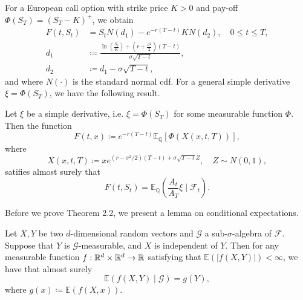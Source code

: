 For a European call option with strike price $K>0$ and pay-off $\Phi(S_{T})=(S_{T}-K)^{+}$, we obtain
\begin{align}
    F(t,S_{t})&=S_{t}N(d_{1})-e^{-r(T-t)}KN(d_{2}),\quad 0\leq t\leq T,\label{BSFormula}\\
    d_{1}&\coloneqq \frac{\ln\left(\frac{S_{t}}{K}\right)+\left(r+\frac{\sigma^{2}}{2}\right)(T-t)}{\sigma\sqrt{T-t}},\\
    d_{2}&\coloneqq d_{1}-\sigma\sqrt{T-t},
\end{align}
and where $N(\cdot)$ is the standard normal cdf. For a general simple derivative $\xi=\Phi(S_{T})$, we have the following result.
\begin{thm}
    Let $\xi$ be a simple derivative, i.e. $\xi=\Phi(S_{T})$ for some measurable function $\Phi$. Then the function
    \begin{equation}
        F(t,x)\coloneqq e^{-r(T-t)}\mathbb{E}_{\mathbb{Q}}\left[\Phi(X(x,t,T))\right],
    \end{equation}
    where 
    \begin{equation}
        X(x,t,T)\coloneqq xe^{(r-\sigma^{2}/2)(T-t)+\sigma\sqrt{T-t}Z},\quad Z\sim N(0,1),
    \end{equation}
satifies almost surely that
\begin{equation}
    F(t,S_{t})=\mathbb{E}_{\mathbb{Q}}\left(\frac{A_{t}}{A_{T}}\xi \mid \mathcal{F}_{t}\right).
\end{equation}
\end{thm}
Before we prove Theorem 2.2, we present a lemma on conditional expectations.
\begin{lem}\label{lem23}
    Let $X,Y$ be two $d$-dimensional random vectors and $\mathcal{G}$ a sub-$\sigma$-algebra of $\mathcal{F}$. Suppose that $Y$ is $\mathcal{G}$-measurable, and $X$ is independent of $Y$. Then for any measurable function $f:\mathbb{R}^{d}\times \mathbb{R}^{d}\to\mathbb{R}$ satisfying that $\mathbb{E}(|f(X,Y)|)<\infty$, we have that almost surely
    \begin{equation}
\mathbb{E}(f(X,Y)\mid \mathcal{G})=g(Y),
    \end{equation}
    where $g(x)\coloneqq \mathbb{E}(f(X,x))$.
\end{lem}
